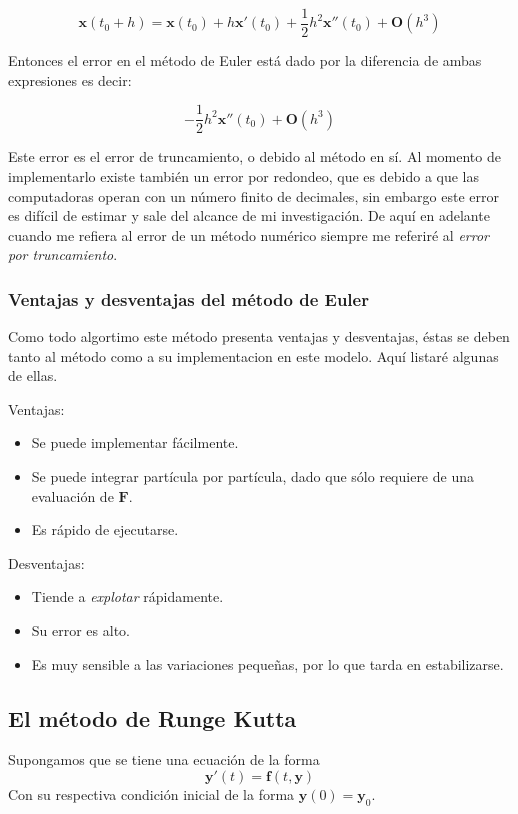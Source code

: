 $$\textbf{x}(t_0 + h) = \textbf{x}(t_0) + h \textbf{x}'(t_0) + \frac{1}{2}h^2\textbf{x}''(t_0) + \textbf{O}(h^3)$$

Entonces el error en el método de Euler está dado por la diferencia de ambas expresiones es decir:

$$-\frac{1}{2}h^2\textbf{x}''(t_0) + \textbf{O}(h^3)$$

Este error es el error de truncamiento, o debido al método en sí.
Al momento de implementarlo existe también un error por redondeo, que es debido a que las computadoras operan con un número finito de decimales, sin embargo este error es difícil de estimar y sale del alcance de mi investigación.
De aquí en adelante cuando me refiera al error de un método numérico siempre me referiré al \emph{error por truncamiento}.

\subsubsection{Ventajas y desventajas del método de Euler}

Como todo algortimo este método presenta ventajas y desventajas, éstas se deben tanto al método como a su implementacion en este modelo.
Aquí listaré algunas de ellas.

Ventajas:
\begin{itemize}
\item Se puede implementar fácilmente.
\item Se puede integrar partícula por partícula, dado que sólo requiere de una evaluación de $\textbf{F}$.
\item Es rápido de ejecutarse.
\end{itemize}

Desventajas:
\begin{itemize}
\item Tiende a \emph{explotar} rápidamente.
\item Su error es alto.
\item Es muy sensible a las variaciones pequeñas, por lo que tarda en estabilizarse.
\end{itemize}

\subsection{El método de Runge Kutta}
Supongamos que se tiene una ecuación de la forma
$$\textbf{y}'(t) = \textbf{f}(t, \textbf{y})$$
Con su respectiva condición inicial de la forma $\textbf{y}(0)=\textbf{y}_0$.


